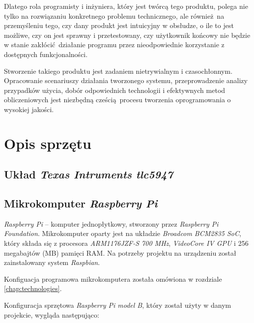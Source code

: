 \documentclass[eng,printmode]{mgr}
\begin{document}
Dlatego rola programisty i inżyniera, który jest twórcą tego produktu, polega nie tylko na rozwiązaniu konkretnego problemu technicznego, ale również na przemyśleniu tego, czy dany produkt jest intuicyjny w obsłudze, o ile to jest możliwe, czy on jest sprawny i przetestowany, czy użytkownik końcowy nie będzie w stanie zakłócić działanie programu przez nieodpowiednie korzystanie z dostępnych funkcjonalności.

Stworzenie takiego produktu jest zadaniem nietrywialnym i czasochłonnym. Opracowanie scenariuszy działania tworzonego systemu, przeprowadzenie analizy przypadków użycia, dobór odpowiednich technologii i efektywnych metod obliczeniowych jest niezbędną cześcią procesu tworzenia oprogramowania o wysokiej jakości.


\chapter{Opis sprzętu}

\section{Układ \emph{Texas Intruments tlc5947}}

\section{Mikrokomputer \emph{Raspberry Pi}}
\emph{Raspberry Pi} -- komputer jednopłytkowy, stworzony przez \emph{Raspberry Pi Foundation}. Mikrokomputer oparty jest na układzie \emph{Broadcom BCM2835 SoC}, który składa się z procesora \emph{ARM1176JZF-S 700 MHz}, \emph{VideoCore IV GPU} i 256 megabajtów (MB) pamięci RAM. Na potrzeby projektu na urządzeniu został zainstalowany system \emph{Raspbian}. 

Konfiguacja programowa mikrokomputera została omówiona w rozdziale \ref{chap:technologies}.

Konfiguracja sprzętowa \emph{Raspberry Pi model B}, który został użyty w danym projekcie, wygląda następująco:
\end{document}
